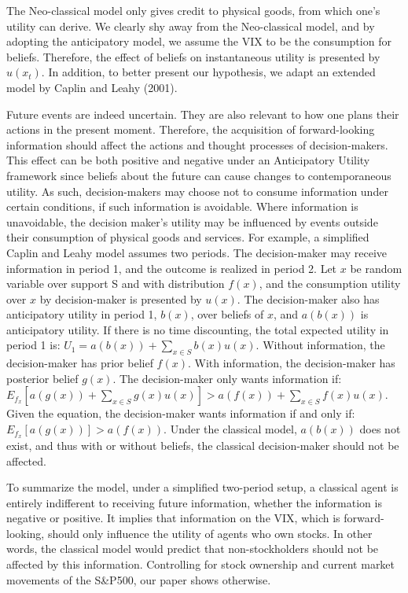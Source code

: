 \documentclass[11pt,a4paper,oldfontcommands]{memoir}
\begin{document}
{The Neo-classical model only gives credit to physical goods, from which one's utility can derive. We clearly shy away from the Neo-classical model, and by adopting the anticipatory model, we assume the VIX to be the consumption for beliefs. Therefore, the effect of beliefs on instantaneous utility is presented by $u(x_t)$. In addition, to better present our hypothesis, we adapt an extended model by Caplin and Leahy (2001). 
 
Future events are indeed uncertain. They are also relevant to how one plans their actions in the present moment. Therefore, the acquisition of forward-looking information should affect the actions and thought processes of decision-makers. This effect can be both positive and negative under an Anticipatory Utility framework since beliefs about the future can cause changes to contemporaneous utility. As such, decision-makers may choose not to consume information under certain conditions, if such information is avoidable. Where information is unavoidable, the decision maker's utility may be influenced by events outside their consumption of physical goods and services. For example, a simplified Caplin and Leahy model assumes two periods. The decision-maker may receive information in period 1, and the outcome is realized in period 2. Let $x$ be random variable over support S and with distribution $f(x)$, and the consumption utility over $x$ by decision-maker is presented by $u(x)$. The decision-maker also has anticipatory utility in period 1, $b(x)$, over beliefs of $x$, and $a(b(x))$ is anticipatory utility. If there is no time discounting, the total expected utility in period 1 is: $U_1=a(b(x)) +\sum_{x \in S} b(x)u(x)$. Without information, the decision-maker has prior belief $f(x)$. With information, the decision-maker has posterior belief $g(x)$. The decision-maker only wants information if: $E_{f_x}[a(g(x)) + \sum_{x \in S} g(x)u(x)]>a(f(x)) + \sum_{x \in S} f(x)u(x)$. Given the equation, the decision-maker wants information if and only if: $E_{f_x}[a(g(x))] > a(f(x))$. Under the classical model, $a(b(x))$ does not exist, and thus with or without beliefs, the classical decision-maker should not be affected. 
  
To summarize the model, under a simplified two-period setup, a classical agent is entirely indifferent to receiving future information, whether the information is negative or positive. It implies that information on the VIX, which is forward-looking, should only influence the utility of agents who own stocks. In other words, the classical model would predict that non-stockholders should not be affected by this information. Controlling for stock ownership and current market movements of the S&P500, our paper shows otherwise.

}
\end{document}
